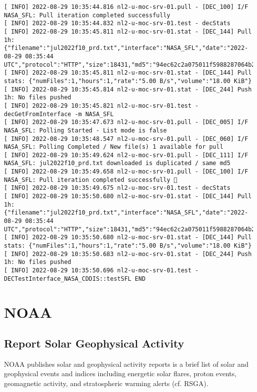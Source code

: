 \documentclass[dec_sum_main.tex]{subfiles}
\begin{document}
\begin{Verbatim}[fontsize=\tiny]
[ INFO] 2022-08-29 10:35:44.816 nl2-u-moc-srv-01.pull - [DEC_100] I/F NASA_SFL: Pull iteration completed successfully
[ INFO] 2022-08-29 10:35:44.832 nl2-u-moc-srv-01.test - decStats
[ INFO] 2022-08-29 10:35:45.811 nl2-u-moc-srv-01.stat - [DEC_144] Pull 1h: {"filename":"jul2022f10_prd.txt","interface":"NASA_SFL","date":"2022-08-29 08:35:44 UTC","protocol":"HTTP","size":18431,"md5":"94ec62c2a075011f5988287064b263ff"}
[ INFO] 2022-08-29 10:35:45.811 nl2-u-moc-srv-01.stat - [DEC_144] Pull stats: {"numFiles":1,"hours":1,"rate":"5.00 B/s","volume":"18.00 KiB"}
[ INFO] 2022-08-29 10:35:45.814 nl2-u-moc-srv-01.stat - [DEC_244] Push 1h: No files pushed
[ INFO] 2022-08-29 10:35:45.821 nl2-u-moc-srv-01.test - decGetFromInterface -m NASA_SFL
[ INFO] 2022-08-29 10:35:47.673 nl2-u-moc-srv-01.pull - [DEC_005] I/F NASA_SFL: Polling Started - List mode is false
[ INFO] 2022-08-29 10:35:48.547 nl2-u-moc-srv-01.pull - [DEC_060] I/F NASA_SFL: Polling Completed / New file(s) 1 available for pull
[ INFO] 2022-08-29 10:35:49.624 nl2-u-moc-srv-01.pull - [DEC_111] I/F NASA_SFL: jul2022f10_prd.txt downloaded is duplicated / same md5
[ INFO] 2022-08-29 10:35:49.658 nl2-u-moc-srv-01.pull - [DEC_100] I/F NASA_SFL: Pull iteration completed successfully 🕺
[ INFO] 2022-08-29 10:35:49.675 nl2-u-moc-srv-01.test - decStats
[ INFO] 2022-08-29 10:35:50.680 nl2-u-moc-srv-01.stat - [DEC_144] Pull 1h: {"filename":"jul2022f10_prd.txt","interface":"NASA_SFL","date":"2022-08-29 08:35:44 UTC","protocol":"HTTP","size":18431,"md5":"94ec62c2a075011f5988287064b263ff"}
[ INFO] 2022-08-29 10:35:50.680 nl2-u-moc-srv-01.stat - [DEC_144] Pull stats: {"numFiles":1,"hours":1,"rate":"5.00 B/s","volume":"18.00 KiB"}
[ INFO] 2022-08-29 10:35:50.683 nl2-u-moc-srv-01.stat - [DEC_244] Push 1h: No files pushed
[ INFO] 2022-08-29 10:35:50.696 nl2-u-moc-srv-01.test - DECTestInterface_NASA_CDDIS::testSFL END
\end{Verbatim}


\pagebreak

\section{NOAA}

\subsection{Report Solar Geophysical Activity}
NOAA publishes solar and geophysical activity reports is a brief list of solar and geophysical events and indices including energetic solar flares, proton events, geomagnetic activity, and stratospheric warming alerts (cf. RSGA). \newline
\end{document}
